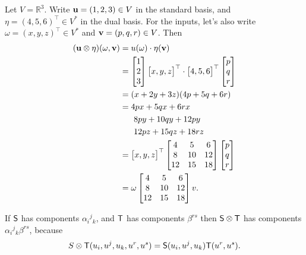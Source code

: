 \begin{exa} Let $V = \mathbb{R}^3$.  Write $\mathbf{ u}= (1,2,3) \in V$ in the standard basis, and $\eta = (4,5,6)^\top \in V^*$ in the dual basis.  For the inputs, let's also write $\omega = (x,y,z)^\top \in V^*$ and $\mathbf{ v} = (p,q,r) \in V$.  Then
\begin{align*}
(\mathbf{ u}\otimes \eta)(\omega, \mathbf{ v}) & = u(\omega) \cdot \eta(\mathbf{ v}) \\
& = \begin{bmatrix}
 1 \\
 2 \\
 3
\end{bmatrix} \begin{bmatrix} x,y,z \end{bmatrix}^\top
\cdot
\begin{bmatrix} 4,5,6 \end{bmatrix}^\top \begin{bmatrix}
 p \\
 q \\
 r
\end{bmatrix} \\
& = (x + 2y + 3z)(4p + 5q + 6r) \\
& = 4px + 5 qx + 6rx \\
& \ \ \ \ \ 8py + 10qy + 12py \\
& \ \ \ \ \ 12pz + 15qz + 18rz \\
& = \begin{bmatrix} x,y,z \end{bmatrix}^\top\begin{bmatrix}
 4 & 5 & 6 \\
 8 & 10 & 12 \\
 12 & 15 & 18
\end{bmatrix}\begin{bmatrix}
 p \\
 q \\
 r
\end{bmatrix} \\
& = \omega \begin{bmatrix}
 4 & 5 & 6 \\
 8 & 10 & 12 \\
 12 & 15 & 18
\end{bmatrix} v.
\end{align*}
\end{exa}


\begin{example}
If $\mathsf{S}$ has components $\alpha_i{}^j{}_k$, and $\mathsf{T}$ has components
$\beta^{rs}$ then $\mathsf{S} \otimes \mathsf{T}$ has components
$\alpha_i{}^j{}_k\beta^{rs}$, because
\[
S \otimes \mathsf{T}(u_i,u^j,u_k,u^r,u^s) = \mathsf{S}(u_i,u^j,u_k)\mathsf{T}(u^r,u^s).
\]
\end{example}


